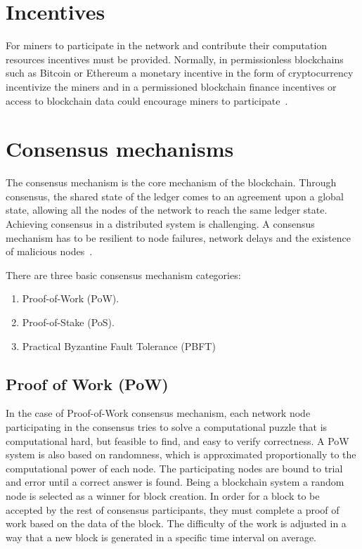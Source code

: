 \section{Incentives}\label{blockchain:incentives}

For miners to participate in the network and contribute their computation resources incentives must be provided.
Normally, in permissionless blockchains such as Bitcoin or Ethereum a monetary incentive in the form of cryptocurrency
incentivize the miners and in a permissioned blockchain finance incentives or access to blockchain data could encourage miners to participate~\cite{deloitte}.

\section{Consensus mechanisms}\label{blockchain:consensus_mechanisms}

The consensus mechanism is the core mechanism of the blockchain. Through consensus, the shared state of the ledger comes to an agreement upon a global state,
allowing all the nodes of the network to reach the same ledger state. Achieving consensus in a distributed system is challenging.
A consensus mechanism has to be resilient to node failures, network delays and the existence of malicious nodes~\cite{wiki:byzantine_fault_tolerance}.

There are three basic consensus mechanism categories:

\begin{enumerate}
  \item Proof-of-Work (PoW).
  \item Proof-of-Stake (PoS).
  \item Practical Byzantine Fault Tolerance (PBFT)
\end{enumerate}


\subsection{Proof of Work (PoW)}\label{blockchain:consensus:pow}

In the case of Proof-of-Work consensus mechanism, each network node participating in
the consensus tries to solve a computational puzzle that is computational hard, but feasible to find, and easy to verify correctness.
A PoW system is also based on randomness, which is approximated proportionally to the computational power of each node.
The participating nodes are bound to trial and error until a correct answer is found. Being a blockchain system a random node is selected as a winner for block creation.
In order for a block to be accepted by the rest of consensus participants, they must complete a proof of work based on the data of the block.
The difficulty of the work is adjusted in a way that a new block is generated in a specific time interval on average.

